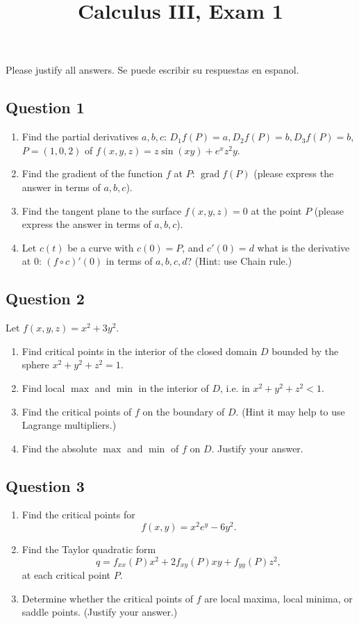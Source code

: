 \documentclass{amsart}
\numberwithin {equation} {section}
\DeclareMathOperator{\grad}{grad}
\begin{document}
 
\title {Calculus III, Exam 1}
\maketitle
Please justify all answers. Se puede escribir su
respuestas en espanol.
\subsection* {Question 1}
\begin{enumerate}
   \item Find the partial derivatives $a,b,c$: $D_1 f (P) =a, D_2f
      (P)=b, D_3f (P)=b$, $P= (1,0,2)$ of $f(x,y,z)= z\sin (xy)+e
      ^{x}z ^{2}y  $.
   \item Find the gradient of the function $f$ at $P$: $\grad f (P)$ (please express the answer in terms of
      $a,b,c$).
   \item Find the tangent plane to the surface $f(x,y,z)=0$ at the point $P$
      (please express the answer in terms of
      $a,b,c$).
   \item Let $c (t)$ be a curve with $c (0)=P$, and $c' (0)=d$ what is the
      derivative at $0$: $(f \circ
      c)' (0)$ in terms of $a,b,c,d$? (Hint: use Chain rule.)
\end{enumerate}
\newpage
\subsection* {Question 2}
Let $f (x,y,z) = x ^{2} + 3y ^{2}$.
\begin{enumerate}
   \item   
Find critical points in the interior of the closed domain $D$ bounded by the sphere $x
^{2} +y ^{2} +z ^{2}=1   $.
\item Find local $\max$ and $\min$ in the interior of $D$, i.e. in
   $x
^{2} +y ^{2} +z ^{2}<1  $.
\item Find the critical points of $f$ on the boundary of $D$.
    (Hint it may help to use
   Lagrange multipliers.)
\item  Find the absolute $\max$ and $\min$ of $f$ on $D$. Justify your answer.
\end{enumerate} 
\newpage

\subsection* {Question 3}
\begin{enumerate}
\item Find the critical points for $$f (x,y)=x ^{2} e ^{y}   - 6y ^{2}.  $$
   \item Find the Taylor quadratic form $$q=f _{xx} (P)x ^{2} + 2f _{xy} (P) xy + f _{yy} (P) z
^{2},  $$  at each critical point $P$.
\item Determine whether the critical points of $f$ are local maxima, local
   minima, or saddle points. (Justify your answer.)
\end{enumerate}
\newpage
\end{document}
